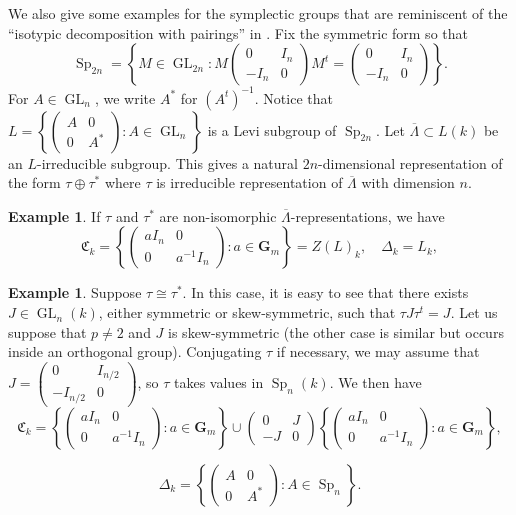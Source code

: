 \documentclass[11pt, letterpaper,english]{amsart}
\theoremstyle{plain}
\theoremstyle{definition}
\newtheorem{example}[lem]{Example}
\numberwithin{equation}{section}
\numberwithin{lem}{section}
\newcommand{\mathfont}{\mathbf}
\newcommand{\fC}{\mathfrak{C}}
\DeclareMathOperator{\GL}{GL}
\DeclareMathOperator{\Sp}{Sp}
\newcommand{\Gm}{\mathfont{G}_m}
\newcommand{\Lbar}{\overline{\Lambda}}
\newcommand{\Dt}{\Delta}
\begin{document}
We also give some examples for the symplectic groups that are reminiscent of the ``isotypic decomposition with pairings'' in \cite[\S6.1]{Booher19}. Fix the symmetric form so that 
$$\Sp_{2n}= \left\{M \in \GL_{2n} :  M \begin{pmatrix}
0 & I_n \\
-I_n & 0
\end{pmatrix} M^t=\begin{pmatrix}
0 & I_n \\
-I_n & 0
\end{pmatrix} \right \}.$$
For $A \in \GL_n$, we write $A^*$ for $(A^t)^{-1}$.  Notice that $L=\left\{ 
\begin{pmatrix}
A & 0 \\
0 & A^*
\end{pmatrix}: A \in \GL_n
\right \}$ is a Levi subgroup of $\Sp_{2n}$. Let $\Lbar \subset L(k)$ be an $L$-irreducible subgroup. This gives a natural $2n$-dimensional representation of the form $\tau \oplus \tau^*$ where $\tau$ is irreducible representation of $\Lbar$ with dimension $n$. 

\begin{example} \label{ex:sympl 1}
If $\tau$ and $\tau^*$ are non-isomorphic $\Lbar$-representations, we have 
\[
\fC_k=\left\{ 
\begin{pmatrix}
aI_n & 0 \\
0 & a^{-1}I_n
\end{pmatrix}: a \in \Gm
\right \}=Z(L)_k, \quad \Dt_k=L_k, 
\]
\end{example}

\begin{example} \label{ex:sympl 2}
Suppose $\tau \cong \tau^*$. In this case, it is easy to see that there exists $J \in 
\GL_n(k)$, either symmetric or skew-symmetric, such that $\tau J \tau^t=J$. Let us suppose that $p \neq 2$ and $J$ is skew-symmetric (the other case is similar but occurs inside an orthogonal group). Conjugating $\tau$ if necessary, we may assume that $J=\begin{pmatrix}
0 & I_{n/2} \\
-I_{n/2} & 0
\end{pmatrix}$, so $\tau$ takes values in $\Sp_n(k)$. We then have
\[
\fC_k=\left\{ 
\begin{pmatrix}
aI_n & 0 \\
0 & a^{-1}I_n
\end{pmatrix} : a \in \Gm
\right\}
\cup \begin{pmatrix}
0 & J \\
-J & 0
\end{pmatrix}
\left\{ 
\begin{pmatrix}
aI_n & 0 \\
0 & a^{-1}I_n
\end{pmatrix}
: a \in \Gm
\right \}, 
\]

\[
\Dt_k=\left\{\begin{pmatrix}
A & 0 \\
0 & A^*
\end{pmatrix}: A \in \Sp_n
\right \}.
\]
\end{example}
\end{document}
